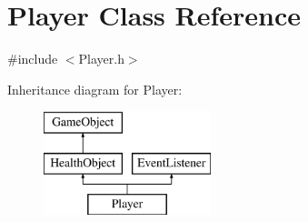 \hypertarget{class_player}{}\section{Player Class Reference}
\label{class_player}


{\ttfamily \#include $<$Player.\+h$>$}

Inheritance diagram for Player\+:\begin{figure}[H]
\begin{center}
\leavevmode
\includegraphics[height=3.000000cm]{class_player}
\end{center}
\end{figure}
